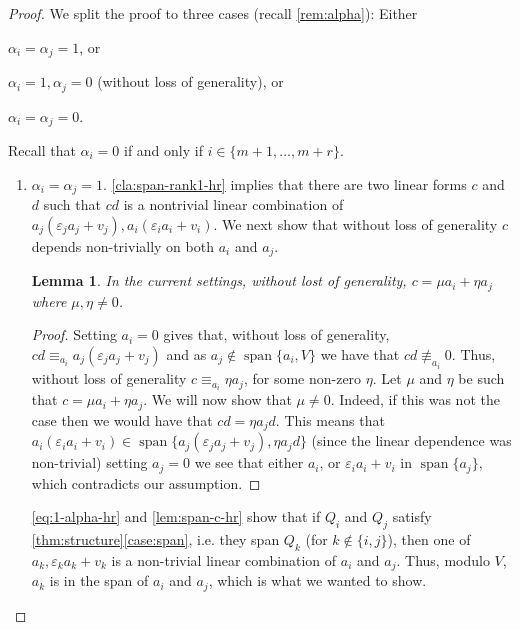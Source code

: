 \documentclass[10pt,a4paper]{article}
\newtheorem{lemma}[theorem]{Lemma}
\newcommand{\spn}[1]{\operatorname{span}\{{#1}\}}
\def\epsilon{\varepsilon}
\begin{document}
\begin{proof}


We split the proof to three cases (recall \autoref{rem:alpha}): Either 
\begin{enumerate*}[label=(\roman*)]
  \item $\alpha_i = \alpha_j = 1$, or 
  \item $\alpha_i = 1, \alpha_j = 0$ (without loss of generality), or
  \item $\alpha_i=\alpha_j = 0$.
\end{enumerate*} 
Recall that $\alpha_i=0$ if and only if $i\in\{m+1,\ldots,m+r\}$. 

\begin{enumerate}[label=(\roman*)]
	\item  $\alpha_i= \alpha_j = 1$. 	
\autoref{cla:span-rank1-hr} implies that there are two linear forms $c$ and $d$ such that $cd$ is a nontrivial linear combination of ${a_j(\epsilon_j a_j + v_j), a_i(\epsilon_i a_i + v_i)}$. We next show that  without loss of generality $c$ depends non-trivially on both $a_i$ and $a_j$.

\begin{lemma}\label{lem:span-c-hr}
In the current settings, without lost of generality, $c= \mu a_i + \eta a_j$ where $\mu,\eta \neq 0$.
\end{lemma}
\begin{proof}

Setting $a_i=0$ gives that, without loss of generality, $cd \equiv_{a_i} a_j(\epsilon_j a_j + v_j)$ and as $a_j\not\in \spn{a_i,V}$ we have that $cd\not\equiv_{a_i}0$. Thus,  without loss of generality $c \equiv_{a_i} \eta a_j$, for some non-zero $\eta$. Let $\mu$ and $\eta$ be such that  $c = \mu a_i + \eta a_j$. We will now show that $\mu  \neq 0$. Indeed, if this was not the case then we would have that $cd = \eta a_j d$.
This means that $ a_i(\epsilon_i a_i + v_i) \in \spn{a_j(\epsilon_j a_j + v_j), \eta a_j d}$ (since the linear dependence was non-trivial) setting $a_j =0$ we see that either $a_i$, or $ \epsilon_i a_i + v_i$ in $\spn{a_j}$, which contradicts our assumption. 

\end{proof}


\autoref{eq:1-alpha-hr} and \autoref{lem:span-c-hr} show that if $Q_i$ and $Q_j$ satisfy \autoref{thm:structure}\ref{case:span}, i.e. they span $Q_k$ (for $k\not\in\{i,j\}$), then one of $a_k,\epsilon_k a_k + v_k$ is a non-trivial linear combination of $a_i$ and $a_j$. Thus, modulo $V$, $a_k$ is in the span of $a_i$ and $a_j$, which is what we wanted to show. 
	

\end{enumerate}
\end{proof}
\end{document}
